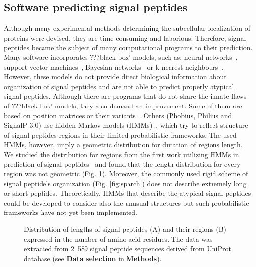 \documentclass[10pt,letterpaper]{article}
\begin{document}
\subsection*{Software predicting signal peptides}

Although many experimental methods determining the subcellular localization of proteins were devised, they are time consuming and laborious. Therefore, signal peptides became the subject of many computational programs to their prediction. Many software incorporates ???black-box’ models, such as: neural networks~\cite{2011petersensignalp}, support vector machines~\cite{2014zhangprediction}, Bayesian networks~\cite{2012zhengsignalbnf} or k-nearest neighbours~\cite{2007shensignall}. However, these models do not provide direct biological information about organization of signal peptides and are not able to predict properly atypical signal peptides. Although there are programs that do not share the innate flaws of ???black-box’ models, they also demand an improvement. Some of them are based on position matrices or their variants~\cite{2014zhangprediction, 2004hillerpredisi}. Others (Phobius, Philius and SignalP 3.0) use hidden Markov models (HMMs)~\cite{2004klla, 2008reynoldstransmembrane, 2004bendtsenimproved}, which try to reflect structure of signal peptides regions in their limited probabilistic frameworks. The used HMMs, however, imply a geometric distribution for duration of regions length. We studied the distribution for regions from the first work utilizing HMMs in prediction of signal peptides~\cite{1998nielsenprediction} and found that the length distribution for every region was not geometric (Fig. \ref{fig:reglen}). Moreover, the commonly used rigid scheme of signal peptide's organization (Fig. \ref{fig:sparch}) does not describe extremely long or short peptides. Theoretically, HMMs that describe the atypical signal peptides could be developed to consider also the unusual structures but such probabilistic frameworks have not yet been implemented.

\begin{figure}[ht]\centering
\caption{Distribution of lengths of signal peptides (A) and their regions (B) expressed in the number of amino acid residues. The data was extracted from 2~589 signal peptide sequences derived from UniProt database (see \textbf{Data selection} in \textbf{Methods}).}
\label{fig:reglen}
\end{figure}
\end{document}
